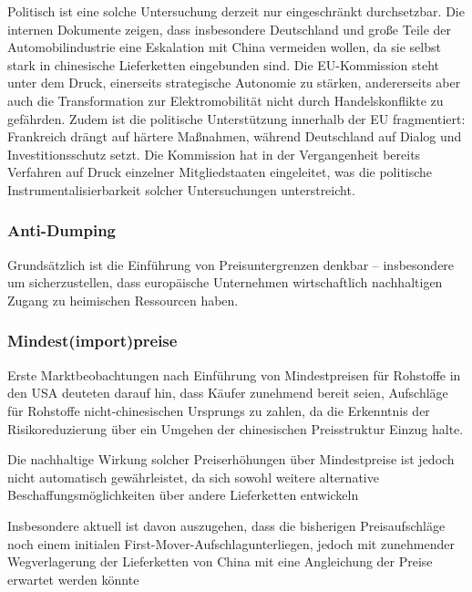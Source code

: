 \documentclass[12pt,a4paper,oneside]{book} %
\begin{document}
Politisch ist eine solche Untersuchung derzeit nur eingeschränkt durchsetzbar. Die internen Dokumente zeigen, dass insbesondere Deutschland und große Teile der Automobilindustrie eine Eskalation mit China vermeiden wollen, da sie selbst stark in chinesische Lieferketten eingebunden sind. Die EU-Kommission steht unter dem Druck, einerseits strategische Autonomie zu stärken, andererseits aber auch die Transformation zur Elektromobilität nicht durch Handelskonflikte zu gefährden. Zudem ist die politische Unterstützung innerhalb der EU fragmentiert: Frankreich drängt auf härtere Maßnahmen, während Deutschland auf Dialog und Investitionsschutz setzt. Die Kommission hat in der Vergangenheit bereits Verfahren auf Druck einzelner Mitgliedstaaten eingeleitet, was die politische Instrumentalisierbarkeit solcher Untersuchungen unterstreicht.


\subsubsection{Anti-Dumping}

Grundsätzlich ist die Einführung von Preisuntergrenzen denkbar --  insbesondere um sicherzustellen, dass europäische Unternehmen wirtschaftlich nachhaltigen Zugang zu heimischen Ressourcen haben.


\subsubsection{Mindest(import)preise}

Erste Marktbeobachtungen nach Einführung von Mindestpreisen für Rohstoffe in den USA deuteten darauf hin, dass Käufer zunehmend bereit seien, Aufschläge für Rohstoffe nicht-chinesischen Ursprungs zu zahlen, da die Erkenntnis der Risikoreduzierung über ein Umgehen der chinesischen Preisstruktur Einzug halte.\autocite{https://www.spglobal.com/energy/en/news-research/latest-news/metals/052926-us-rare-earth-price-floors-aim-to-challenge-chinas-market-grip}


Die nachhaltige Wirkung solcher Preiserhöhungen über Mindestpreise ist jedoch nicht automatisch gewährleistet, da sich sowohl weitere alternative Beschaffungsmöglichkeiten über andere Lieferketten entwickeln 



Insbesondere aktuell ist davon auszugehen, dass die bisherigen Preisaufschläge noch einem initialen \glqq First-Mover-Aufschlag\grqq unterliegen, jedoch mit zunehmender Wegverlagerung der Lieferketten von China mit eine Angleichung der Preise erwartet werden könnte
\end{document}
